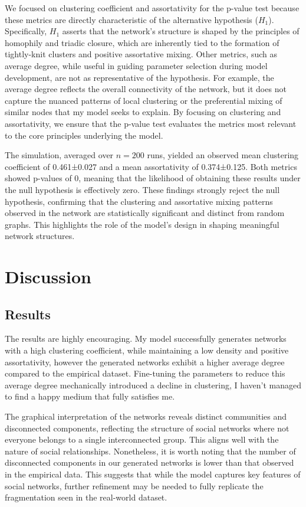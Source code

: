\documentclass[runningheads]{llncs}
\begin{document}
 We focused on clustering coefficient and assortativity for the p-value test because these metrics are directly characteristic of the alternative hypothesis ($H_1$). Specifically, $H_1$ asserts that the network's structure is shaped by the principles of homophily and triadic closure, which are inherently tied to the formation of tightly-knit clusters and positive assortative mixing. Other metrics, such as average degree, while useful in guiding parameter selection during model development, are not as representative of the hypothesis. For example, the average degree reflects the overall connectivity of the network, but it does not capture the nuanced patterns of local clustering or the preferential mixing of similar nodes that my model seeks to explain. By focusing on clustering and assortativity, we ensure that the p-value test evaluates the metrics most relevant to the core principles underlying the model.

The simulation, averaged over $n = 200$ runs, yielded an observed mean clustering coefficient of 0.461±0.027 and a mean assortativity of 0.374±0.125. Both metrics showed p-values of 0, meaning that the likelihood of obtaining these results under the null hypothesis is effectively zero. These findings strongly reject the null hypothesis, confirming that the clustering and assortative mixing patterns observed in the network are statistically significant and distinct from random graphs. This highlights the role of the model's design in shaping meaningful network structures.

\section{Discussion}
\subsection{Results}
The results are highly encouraging.  My model successfully generates networks with a high clustering coefficient, while maintaining a low density and positive assortativity, however the generated networks exhibit a higher average degree compared to the empirical dataset.
Fine-tuning the parameters to reduce this average degree mechanically introduced a decline in clustering, I haven't managed to find a happy medium that fully satisfies me.

The graphical interpretation of the networks reveals distinct communities and disconnected components, reflecting the structure of social networks where not everyone belongs to a single interconnected group. This aligns well with the nature of social relationships. Nonetheless, it is worth noting that the number of disconnected components in our generated networks is lower than that observed in the empirical data. This suggests that while the model captures key features of social networks, further refinement may be needed to fully replicate the fragmentation seen in the real-world dataset.
\end{document}

